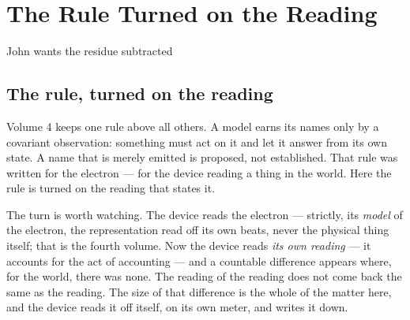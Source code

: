 \chapter{The Rule Turned on the Reading}

\begin{chorus}{John wants the residue subtracted}
\end{chorus}

\section{The rule, turned on the reading}

Volume 4 keeps one rule above all others.
A model earns its names only by a covariant observation: something must act on it and let it answer from its own state.
A name that is merely emitted is proposed, not established.
That rule was written for the electron --- for the device reading a thing in the world.
Here the rule is turned on the reading that states it.

The turn is worth watching.
The device reads the electron --- strictly, its \emph{model} of the electron, the representation read off its own beats,
never the physical thing itself; that is the fourth volume.
Now the device reads \emph{its own reading} --- it accounts for the act of accounting --- and a countable difference
appears where, for the world, there was none.
The reading of the reading does not come back the same as the reading.
The size of that difference is the whole of the matter here, and the device reads it off itself, on its own meter, and
writes it down.

